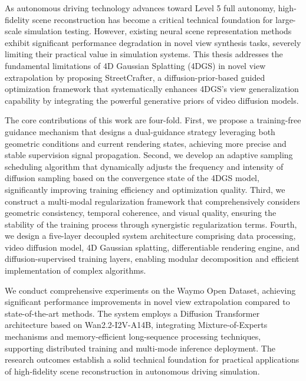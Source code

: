 \begin{abstract*}
  As autonomous driving technology advances toward Level 5 full autonomy, high-fidelity scene reconstruction has become a critical technical foundation for large-scale simulation testing. However, existing neural scene representation methods exhibit significant performance degradation in novel view synthesis tasks, severely limiting their practical value in simulation systems. This thesis addresses the fundamental limitations of 4D Gaussian Splatting (4DGS) in novel view extrapolation by proposing StreetCrafter, a diffusion-prior-based guided optimization framework that systematically enhances 4DGS's view generalization capability by integrating the powerful generative priors of video diffusion models.

  The core contributions of this work are four-fold. First, we propose a training-free guidance mechanism that designs a dual-guidance strategy leveraging both geometric conditions and current rendering states, achieving more precise and stable supervision signal propagation. Second, we develop an adaptive sampling scheduling algorithm that dynamically adjusts the frequency and intensity of diffusion sampling based on the convergence state of the 4DGS model, significantly improving training efficiency and optimization quality. Third, we construct a multi-modal regularization framework that comprehensively considers geometric consistency, temporal coherence, and visual quality, ensuring the stability of the training process through synergistic regularization terms. Fourth, we design a five-layer decoupled system architecture comprising data processing, video diffusion model, 4D Gaussian splatting, differentiable rendering engine, and diffusion-supervised training layers, enabling modular decomposition and efficient implementation of complex algorithms.

  We conduct comprehensive experiments on the Waymo Open Dataset, achieving significant performance improvements in novel view extrapolation compared to state-of-the-art methods. The system employs a Diffusion Transformer architecture based on Wan2.2-I2V-A14B, integrating Mixture-of-Experts mechanisms and memory-efficient long-sequence processing techniques, supporting distributed training and multi-mode inference deployment. The research outcomes establish a solid technical foundation for practical applications of high-fidelity scene reconstruction in autonomous driving simulation.

\end{abstract*}
